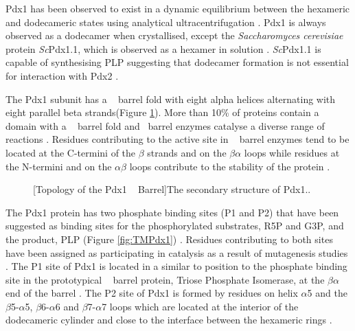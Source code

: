 Pdx1 has been observed to exist in a dynamic equilibrium between the hexameric and dodecameric states using analytical ultracentrifugation \cite{Strohmeier2006,Zhu2005}. Pdx1 is always observed as a dodecamer when crystallised, except the \textit{Saccharomyces cerevisiae} protein \textit{Sc}Pdx1.1, which is observed as a hexamer in solution \cite{Neuwirth2009}. \textit{Sc}Pdx1.1 is capable of synthesising PLP suggesting that dodecamer formation is not essential for interaction with Pdx2 \cite{Neuwirth2009}.  	

The Pdx1 subunit has a \TIM~ barrel fold with eight alpha helices alternating with eight parallel beta strands(Figure \ref{fig:TIMTopology}). More than 10\% of proteins contain a domain with a \TIM~ barrel fold and \TIM ~barrel enzymes catalyse a diverse range of reactions \cite{Sterner2005}. Residues contributing to the active site in \TIM~ barrel enzymes tend to be located at the C-termini of the $\beta$ strands and on the $\beta\alpha$ loops while residues at the N-termini and on the $\alpha\beta$ loops contribute to the stability of the protein \cite{Sterner2005}. 

\begin{figure}[!htbp]
\begin{minipage}{\linewidth}

	[Topology of the Pdx1 \TIM~ Barrel]{The secondary structure of Pdx1.\cite{Zein2006,Strohmeier2006}. \label{fig:TIMTopology}}	
\end{minipage}  
\end{figure}

The Pdx1 protein has two phosphate binding sites (P1 and P2) that have been suggested as binding sites for the phosphorylated substrates, R5P and G3P, and the product, PLP (Figure \ref{fig:TMPdx1}) \cite{Zein2006}. Residues contributing to both sites have been assigned as participating in catalysis as a result of mutagenesis studies \cite{Moccand2011}. The P1 site of Pdx1 is located in a similar to position to the phosphate binding site in the prototypical \TIM~ barrel protein, Triose Phosphate Isomerase, at the $\beta\alpha$ end of the barrel \cite{Zhu2005,Noble1991}. The P2 site of Pdx1 is formed by residues on helix $\alpha$5 and the $\beta$5-$\alpha$5, $\beta$6-$\alpha$6 and $\beta$7-$\alpha$7 loops which are located at the interior of the dodecameric cylinder and close to the interface between the hexameric rings \cite{Zein2006}.   

